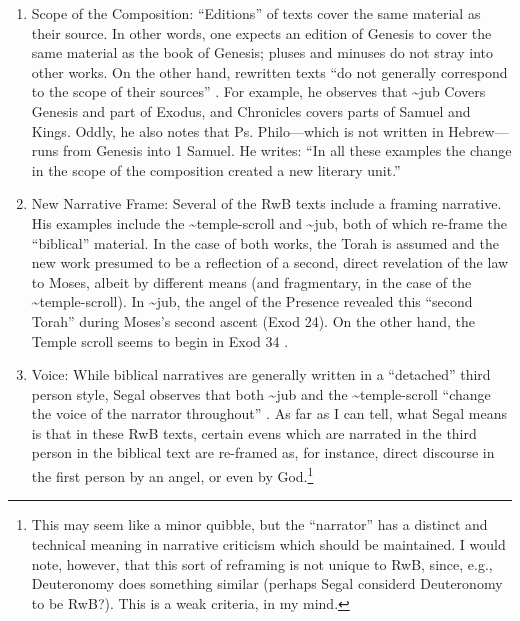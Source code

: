 \begin{enumerate}
\def\labelenumi{\arabic{enumi}.}
\item
  Scope of the Composition: ``Editions'' of texts cover the same
  material as their source. In other words, one expects an edition of
  Genesis to cover the same material as the book of Genesis; pluses and
  minuses do not stray into other works. On the other hand, rewritten
  texts ``do not generally correspond to the scope of their sources''
  \autocite[20]{segal_henze2005}. For example, he observes that
  \textasciitilde{}jub Covers Genesis and part of Exodus, and Chronicles
  covers parts of Samuel and Kings. Oddly, he also notes that Ps.
  Philo---which is not written in Hebrew---runs from Genesis into 1
  Samuel. He writes: ``In all these examples the change in the scope of
  the composition created a new literary unit.''
  \autocite[20--21]{segal_henze2005}
\item
  New Narrative Frame: Several of the RwB texts include a framing
  narrative. His examples include the \textasciitilde{}temple-scroll and
  \textasciitilde{}jub, both of which re-frame the ``biblical''
  material. In the case of both works, the Torah is assumed and the new
  work presumed to be a reflection of a second, direct revelation of the
  law to Moses, albeit by different means (and fragmentary, in the case
  of the \textasciitilde{}temple-scroll). In \textasciitilde{}jub, the
  angel of the Presence revealed this ``second Torah'' during Moses's
  second ascent (Exod 24). On the other hand, the Temple scroll seems to
  begin in Exod 34 \autocite[22]{segal_henze2005}.
\item
  Voice: While biblical narratives are generally written in a
  ``detached'' third person style, Segal observes that both
  \textasciitilde{}jub and the \textasciitilde{}temple-scroll ``change
  the voice of the narrator throughout'' \autocite[22]{segal_henze2005}.
  As far as I can tell, what Segal means is that in these RwB texts,
  certain evens which are narrated in the third person in the biblical
  text are re-framed as, for instance, direct discourse in the first
  person by an angel, or even by God.\footnote{This may seem like a
    minor quibble, but the ``narrator'' has a distinct and technical
    meaning in narrative criticism which should be maintained. I would
    note, however, that this sort of reframing is not unique to RwB,
    since, e.g., Deuteronomy does something similar (perhaps Segal
    considerd Deuteronomy to be RwB?). This is a weak criteria, in my
    mind.}
\end{enumerate}

